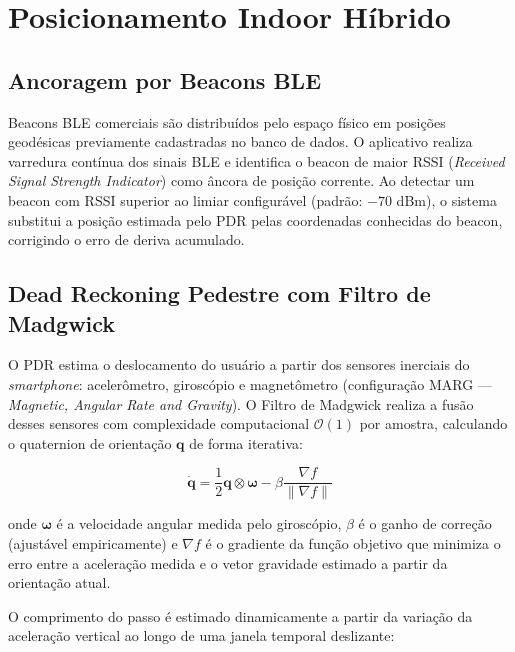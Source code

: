 \documentclass[12pt]{article}
\begin{document}
\section{Posicionamento Indoor Híbrido}

\subsection{Ancoragem por Beacons BLE}

Beacons BLE comerciais são distribuídos pelo espaço físico em posições geodésicas
previamente cadastradas no banco de dados. O aplicativo realiza varredura contínua
dos sinais BLE e identifica o beacon de maior RSSI (\textit{Received Signal Strength
Indicator}) como âncora de posição corrente. Ao detectar um beacon com RSSI superior
ao limiar configurável (padrão: $-70$ dBm), o sistema substitui a posição estimada
pelo PDR pelas coordenadas conhecidas do beacon, corrigindo o erro de deriva acumulado.

\subsection{Dead Reckoning Pedestre com Filtro de Madgwick}

O PDR estima o deslocamento do usuário a partir dos sensores inerciais do
\textit{smartphone}: acelerômetro, giroscópio e magnetômetro (configuração MARG ---
\textit{Magnetic, Angular Rate and Gravity}). O Filtro de Madgwick \cite{Madgwick2010}
realiza a fusão desses sensores com complexidade computacional $\mathcal{O}(1)$ por
amostra, calculando o quaternion de orientação $\mathbf{q}$ de forma iterativa:

\begin{equation}
  \dot{\mathbf{q}} = \frac{1}{2}\mathbf{q} \otimes \boldsymbol{\omega} -
  \beta \frac{\nabla f}{\|\nabla f\|}
  \label{eq:madgwick}
\end{equation}

\noindent onde $\boldsymbol{\omega}$ é a velocidade angular medida pelo giroscópio,
$\beta$ é o ganho de correção (ajustável empiricamente) e $\nabla f$ é o gradiente
da função objetivo que minimiza o erro entre a aceleração medida e o vetor gravidade
estimado a partir da orientação atual.

O comprimento do passo é estimado dinamicamente a partir da variação da aceleração
vertical ao longo de uma janela temporal deslizante:
\end{document}
